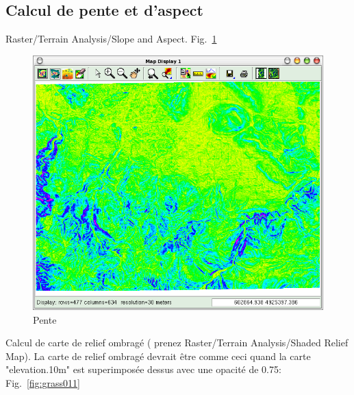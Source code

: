 \subsection{Calcul de pente et d'aspect}
Raster/Terrain Analysis/Slope and Aspect. Fig.~\ref{fig:grass010}

\begin{figure}[htbp]
   \centering
   \includegraphics[scale=0.35]{grass010.png}
   \caption{Pente}
   \label{fig:grass010}
\end{figure}

Calcul de carte de relief ombrag\'e ( prenez Raster/Terrain Analysis/Shaded Relief Map).
La carte de relief ombrag\'e devrait \^etre comme ceci quand la carte "elevation.10m" est superimpos\'ee dessus avec une opacit\'e de 0.75: Fig.~\ref{fig:grass011}

